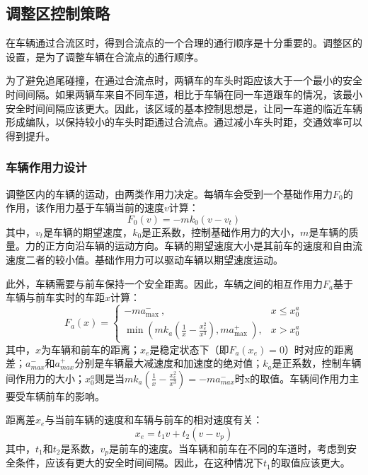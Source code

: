 \subsection{调整区控制策略}
在车辆通过合流区时，得到合流点的一个合理的通行顺序是十分重要的\cite{guler2014using}。调整区的设置，是为了调整车辆在合流点的通行顺序。

为了避免追尾碰撞，在通过合流点时，两辆车的车头时距应该大于一个最小的安全时间间隔。如果两辆车来自不同车道，相比于车辆在同一车道跟车的情况，该最小安全时间间隔应该更大。因此，该区域的基本控制思想是，让同一车道的临近车辆形成编队，以保持较小的车头时距通过合流点。通过减小车头时距，交通效率可以得到提升。

\subsubsection{车辆作用力设计}
调整区内的车辆的运动，由两类作用力决定。每辆车会受到一个基础作用力$F_0$的作用，该作用力基于车辆当前的速度$v$计算：
\begin{equation}
    F_0(v) = -mk_0(v-v_t)
    \label{eq:fund_force}
\end{equation}
其中，$v_t$是车辆的期望速度，$k_0$是正系数，控制基础作用力的大小，$m$是车辆的质量。力的正方向沿车辆的运动方向。车辆的期望速度大小是其前车的速度和自由流速度二者的较小值。基础作用力可以驱动车辆以期望速度运动。

此外，车辆需要与前车保持一个安全距离。因此，车辆之间的相互作用力$F_a$基于车辆与前车实时的车距$x$计算：
\begin{equation}
    F_{a}(x)=\left\{
    \begin{array}{cc}
        -m a_{\text {max }}^{-},                                                                           & x \leq x_{0}^{a} \\
        \min \left(m k_{a}\left(\frac{1}{x}-\frac{x_{e}^{2}}{x^{3}}\right), m a_{\text {max }}^{+}\right), & x>x_{0}^{a}
    \end{array}
    \right.
    \label{eq:inter_force_adjust}
\end{equation}
其中，$x$为车辆和前车的距离；$x_e$是稳定状态下（即$F_a(x_e)=0$）时对应的距离差；$a_{max}^-$和$a_{max}^+$分别是车辆最大减速度和加速度的绝对值；$k_a$是正系数，控制车辆间作用力的大小；$x_0^a$则是当$mk_a(\frac{1}{x}-\frac{x_e^2}{x^3})=-ma_{max}^-$时x的取值。车辆间作用力主要受车辆前车的影响。

距离差$x_e$与当前车辆的速度和车辆与前车的相对速度有关：
\begin{equation}
    x_{e}=t_1v+t_2(v-v_p)
    \label{eq:balance_dist}
\end{equation}
其中，$t_1$和$t_2$是系数，$v_p$是前车的速度。当车辆和前车在不同的车道时，考虑到安全条件，应该有更大的安全时间间隔。因此，在这种情况下$t_1$的取值应该更大。


